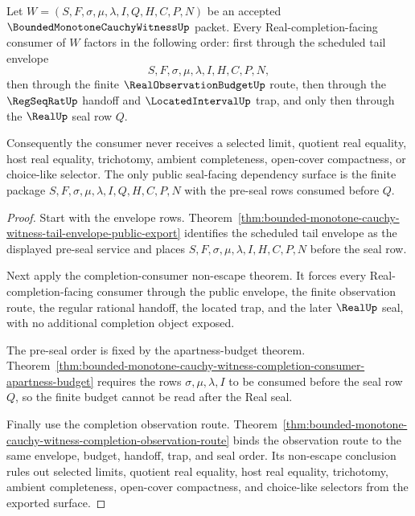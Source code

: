 \begin{theorem}
\label{thm:bounded-monotone-cauchy-witness-real-observation-seal-factorization}
Let $W=(S,F,\sigma,\mu,\lambda,I,Q,H,C,P,N)$ be an accepted $\BoundedMonotoneCauchyWitnessUp$ packet. Every Real-completion-facing consumer of $W$ factors in the following order: first through the scheduled tail envelope
$$
S,F,\sigma,\mu,\lambda,I,H,C,P,N,
$$
then through the finite $\RealObservationBudgetUp$ route, then through the $\RegSeqRatUp$ handoff and $\LocatedIntervalUp$ trap, and only then through the $\RealUp$ seal row $Q$.

Consequently the consumer never receives a selected limit, quotient real equality, host real equality, trichotomy, ambient completeness, open-cover compactness, or choice-like selector. The only public seal-facing dependency surface is the finite package $S,F,\sigma,\mu,\lambda,I,Q,H,C,P,N$ with the pre-seal rows consumed before $Q$.
\end{theorem}
\begin{proof}
Start with the envelope rows. Theorem~\ref{thm:bounded-monotone-cauchy-witness-tail-envelope-public-export} identifies the scheduled tail envelope as the displayed pre-seal service and places $S,F,\sigma,\mu,\lambda,I,H,C,P,N$ before the seal row.

Next apply the completion-consumer non-escape theorem. It forces every Real-completion-facing consumer through the public envelope, the finite observation route, the regular rational handoff, the located trap, and the later $\RealUp$ seal, with no additional completion object exposed.

The pre-seal order is fixed by the apartness-budget theorem. Theorem~\ref{thm:bounded-monotone-cauchy-witness-completion-consumer-apartness-budget} requires the rows $\sigma,\mu,\lambda,I$ to be consumed before the seal row $Q$, so the finite budget cannot be read after the Real seal.

Finally use the completion observation route. Theorem~\ref{thm:bounded-monotone-cauchy-witness-completion-observation-route} binds the observation route to the same envelope, budget, handoff, trap, and seal order. Its non-escape conclusion rules out selected limits, quotient real equality, host real equality, trichotomy, ambient completeness, open-cover compactness, and choice-like selectors from the exported surface.
\end{proof}

